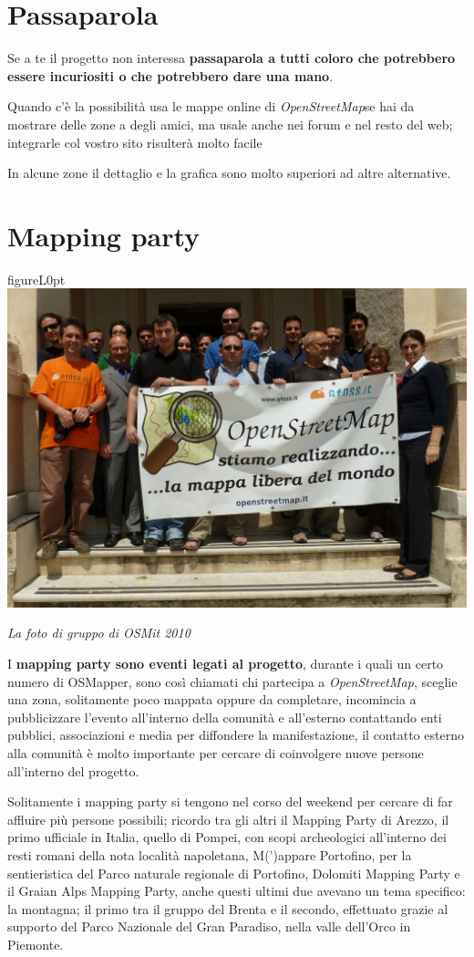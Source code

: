 \documentclass[a4paper,twoside,12pt,]{article}
\newcommand{\osm}{\emph{OpenStreetMap\xspace}}
\begin{document}
\section{Passaparola}
Se a te il progetto non interessa \textbf{passaparola a tutti coloro che potrebbero essere incuriositi o che potrebbero dare una mano}.

Quando c'è la possibilità usa le mappe online di \osm se hai da mostrare delle zone a degli amici, ma usale anche nei forum e nel resto del web; integrarle col vostro sito risulterà molto facile %
 
In alcune zone il dettaglio e la grafica sono molto superiori ad altre alternative.
\section{Mapping party}
\begin{wrapfloat}{figure}{L}{0pt}
 \includegraphics[width=0.55\columnwidth]{Osmit2010.JPG}
 \caption{\small{\textit{La foto di gruppo di OSMit 2010}}}
\end{wrapfloat}
I \textbf{mapping party sono eventi legati al progetto}, durante i quali un certo numero di OSMapper, sono così chiamati chi partecipa a \osm, sceglie una zona, solitamente poco mappata oppure da completare, incomincia a pubblicizzare l'evento all'interno della comunità e all'esterno contattando enti pubblici, associazioni e media per diffondere la manifestazione, il contatto esterno alla comunità è molto importante per cercare di coinvolgere nuove persone all'interno del progetto.

Solitamente i mapping party si tengono nel corso del weekend per cercare di far affluire più persone possibili; ricordo tra gli altri il Mapping Party di Arezzo, il primo ufficiale in Italia, quello di Pompei, con scopi archeologici all'interno dei resti romani della nota località napoletana, M(')appare Portofino, per la sentieristica del Parco naturale regionale di Portofino, Dolomiti Mapping Party e il Graian Alps Mapping Party, anche questi ultimi due avevano un tema specifico: la montagna; il primo tra il gruppo del Brenta e il secondo, effettuato grazie al supporto del Parco Nazionale del Gran Paradiso, nella valle dell'Orco in Piemonte.
\end{document}

